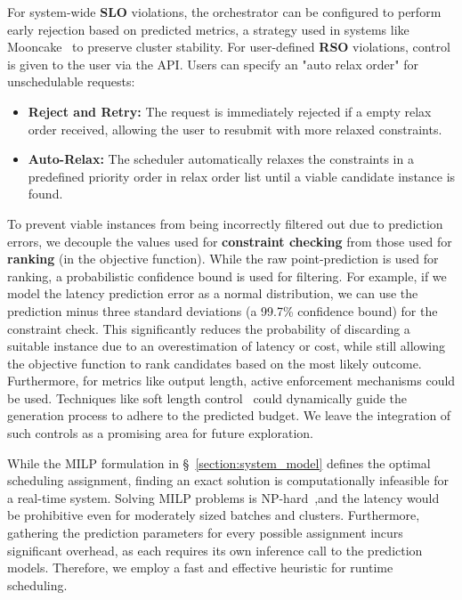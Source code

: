 \documentclass[letterpaper, anonymous, twocolumn, 10pt]{article}
\begin{document}
For system-wide \textbf{SLO} violations, the orchestrator can be configured to perform early rejection based on predicted metrics, a strategy used in systems like Mooncake~\cite{qin_mooncake_2024} to preserve cluster stability. For user-defined \textbf{RSO} violations, control is given to the user via the API. Users can specify an "auto relax order" for unschedulable requests:
\begin{itemize}
    \item \textbf{Reject and Retry:} The request is immediately rejected if a empty relax order received, allowing the user to resubmit with more relaxed constraints.
    \item \textbf{Auto-Relax:} The scheduler automatically relaxes the constraints in a predefined priority order in relax order list until a viable candidate instance is found.
\end{itemize}

To prevent viable instances from being incorrectly filtered out due to prediction errors, we decouple the values used for \textbf{constraint checking} from those used for \textbf{ranking} (in the objective function). While the raw point-prediction is used for ranking, a probabilistic confidence bound is used for filtering. For example, if we model the latency prediction error as a normal distribution, we can use the prediction minus three standard deviations (a 99.7\% confidence bound) for the constraint check. This significantly reduces the probability of discarding a suitable instance due to an overestimation of latency or cost, while still allowing the objective function to rank candidates based on the most likely outcome.
Furthermore, for metrics like output length, active enforcement mechanisms could be used. Techniques like soft length control~\cite{Butcher_2025, gu-etal-2025-length} could dynamically guide the generation process to adhere to the predicted budget. We leave the integration of such controls as a promising area for future exploration.

While the MILP formulation in \S~\ref{section:system_model} defines the optimal scheduling assignment, finding an exact solution is computationally infeasible for a real-time system. Solving MILP problems is NP-hard~\cite{nair2021solvingmixedintegerprograms},and the latency would be prohibitive even for moderately sized batches and clusters. Furthermore, gathering the prediction parameters for every possible assignment incurs significant overhead, as each requires its own inference call to the prediction models. Therefore, we employ a fast and effective heuristic for runtime scheduling.
\end{document}
